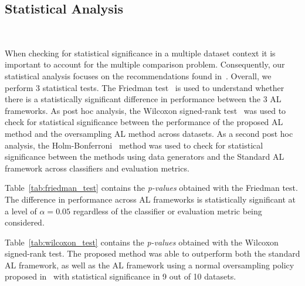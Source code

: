 \documentclass[preprint, 12pt]{elsarticle}
\begin{document}
\subsection{Statistical Analysis}~\label{sec:statistical-analysis}

When checking for statistical significance in a multiple dataset context it is
important to account for the multiple comparison problem. Consequently, our
statistical analysis focuses on the recommendations found
in~\cite{Demsar2006}. Overall, we perform 3 statistical tests. The Friedman
test~\cite{Friedman1937} is used to understand whether there is a
statistically significant difference in performance between the 3 AL
frameworks. As post hoc analysis, the Wilcoxon signed-rank
test~\cite{Wilcoxon1945} was used to check for statistical significance
between the performance of the proposed AL method and the oversampling AL
method across datasets. As a second post hoc analysis, the
Holm-Bonferroni~\cite{Holm1979} method was used to check for statistical
significance between the methods using data generators and the Standard AL
framework across classifiers and evaluation metrics.
 
Table~\ref{tab:friedman_test} contains the \textit{p-values} obtained with the
Friedman test. The difference in performance across AL frameworks is
statistically significant at a level of $\alpha = 0.05$ regardless of the
classifier or evaluation metric being considered.

\begin{table}[H]
	\centering
    \caption{%
        Results for Friedman test. Statistical significance is tested at a
        level of $\alpha = 0.05$. The null hypothesis is that there is no
        difference in the classification outcome across oversamplers.
    }\label{tab:friedman_test}
\end{table}

Table~\ref{tab:wilcoxon_test} contains the \textit{p-values} obtained with the
Wilcoxon signed-rank test. The proposed method was able to outperform both the
standard AL framework, as well as the AL framework using a normal oversampling
policy proposed in~\cite{Fonseca2021} with statistical significance in 9 out
of 10 datasets.

\begin{table}
	\centering
    \caption{%
        Adjusted p-values using the Wilcoxon signed-rank method. Bold values
        are statistically significant at a level of $\alpha = 0.05$. The null
        hypothesis is that the performance of the proposed framework is
        similar to that of the oversampling or standard framework.
    }\label{tab:wilcoxon_test}
\end{table}
\end{document}
